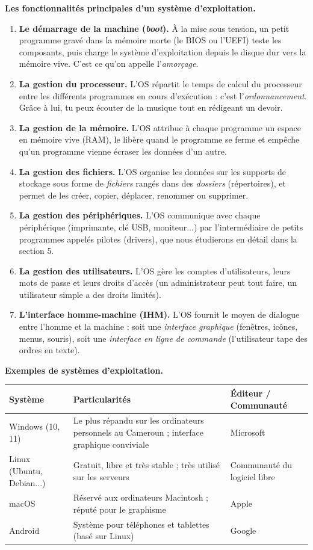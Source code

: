 \documentclass[11pt]{article}
\newcommand{\cle}[1]{{\popxbold\color{popdark}#1}}
\begin{document}
\textbf{Les fonctionnalités principales d'un système d'exploitation.}

\begin{enumerate}
\item \textbf{Le démarrage de la machine (\emph{boot}).} À la mise sous tension, un petit programme gravé dans la mémoire morte (le BIOS ou l'UEFI) teste les composants, puis charge le système d'exploitation depuis le disque dur vers la mémoire vive. C'est ce qu'on appelle l'\emph{amorçage}.
\item \textbf{La gestion du processeur.} L'OS répartit le temps de calcul du processeur entre les différents programmes en cours d'exécution : c'est l'\emph{ordonnancement}. Grâce à lui, tu peux écouter de la musique tout en rédigeant un devoir.
\item \textbf{La gestion de la mémoire.} L'OS attribue à chaque programme un espace en mémoire vive (RAM), le libère quand le programme se ferme et empêche qu'un programme vienne écraser les données d'un autre.
\item \textbf{La gestion des fichiers.} L'OS organise les données sur les supports de stockage sous forme de \emph{fichiers} rangés dans des \emph{dossiers} (répertoires), et permet de les créer, copier, déplacer, renommer ou supprimer.
\item \textbf{La gestion des périphériques.} L'OS communique avec chaque périphérique (imprimante, clé USB, moniteur...) par l'intermédiaire de petits programmes appelés \cle{pilotes} (drivers), que nous étudierons en détail dans la section 5.
\item \textbf{La gestion des utilisateurs.} L'OS gère les comptes d'utilisateurs, leurs mots de passe et leurs droits d'accès (un administrateur peut tout faire, un utilisateur simple a des droits limités).
\item \textbf{L'interface homme-machine (IHM).} L'OS fournit le moyen de dialogue entre l'homme et la machine : soit une \emph{interface graphique} (fenêtres, icônes, menus, souris), soit une \emph{interface en ligne de commande} (l'utilisateur tape des ordres en texte).
\end{enumerate}

\textbf{Exemples de systèmes d'exploitation.}

\begin{center}
\begin{tabularx}{\linewidth}{|l|X|l|}
\hline
\rowcolor{popblueL} \textbf{Système} & \textbf{Particularités} & \textbf{Éditeur / Communauté} \\
\hline
Windows (10, 11) & Le plus répandu sur les ordinateurs personnels au Cameroun ; interface graphique conviviale & Microsoft \\
\hline
Linux (Ubuntu, Debian...) & Gratuit, libre et très stable ; très utilisé sur les serveurs & Communauté du logiciel libre \\
\hline
macOS & Réservé aux ordinateurs Macintosh ; réputé pour le graphisme & Apple \\
\hline
Android & Système pour téléphones et tablettes (basé sur Linux) & Google \\
\hline
\end{tabularx}
\end{center}
\end{document}
